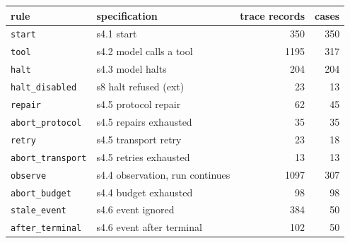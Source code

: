 \begin{tabular}{llrr}
\toprule
rule & specification & trace records & cases \\
\midrule
\texttt{start} & s4.1 start & 350 & 350 \\
\texttt{tool} & s4.2 model calls a tool & 1195 & 317 \\
\texttt{halt} & s4.3 model halts & 204 & 204 \\
\texttt{halt\_disabled} & s8 halt refused (ext) & 23 & 13 \\
\texttt{repair} & s4.5 protocol repair & 62 & 45 \\
\texttt{abort\_protocol} & s4.5 repairs exhausted & 35 & 35 \\
\texttt{retry} & s4.5 transport retry & 23 & 18 \\
\texttt{abort\_transport} & s4.5 retries exhausted & 13 & 13 \\
\texttt{observe} & s4.4 observation, run continues & 1097 & 307 \\
\texttt{abort\_budget} & s4.4 budget exhausted & 98 & 98 \\
\texttt{stale\_event} & s4.6 event ignored & 384 & 50 \\
\texttt{after\_terminal} & s4.6 event after terminal & 102 & 50 \\
\bottomrule
\end{tabular}
